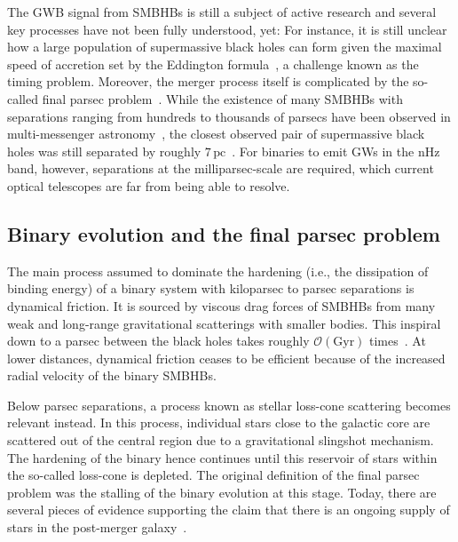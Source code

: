 The \ac{GWB} signal from \acp{SMBHB} is still a subject of active research and several key processes have not been fully understood, yet: For instance, it is still unclear how a large population of supermassive black holes can form given the maximal speed of accretion set by the Eddington formula~\cite{Volonteri:2021sfo}, a challenge known as the timing problem.  Moreover, the merger process itself is complicated by the so-called final parsec problem~\cite{Binney:1987, Milosavljevic:2002ht, Dosopoulou:2016hbg}. While the existence of many \acp{SMBHB} with separations ranging from hundreds to thousands of parsecs have been observed in multi-messenger astronomy~\cite{DeRosa:2019myq}, the closest observed pair of supermassive black holes was still separated by roughly $7 \, \text{pc}$~\cite{Rodriguez:2006th}. For binaries to emit \acp{GW} in the nHz band, however, separations at the milliparsec-scale are required, which current optical telescopes are far from being able to resolve.

\subsection{Binary evolution and the final parsec problem} \label{sec:finalpc}

The main process assumed to dominate the hardening (i.e., the dissipation of binding energy) of a binary system with kiloparsec to parsec separations is dynamical friction. It is sourced by viscous drag forces of \acp{SMBHB} from many weak and long-range gravitational scatterings with smaller bodies.  This inspiral down to a parsec between the black holes takes roughly $\mathcal{O}(\text{Gyr})$ times~\cite{Binney:1987, Dosopoulou:2016hbg}. At lower distances, dynamical friction ceases to be efficient because of the increased radial velocity of the binary \acp{SMBHB}.

Below parsec separations, a process known as stellar loss-cone scattering becomes relevant instead. In this process, individual stars close to the galactic core are scattered out of the central region due  to a gravitational slingshot mechanism. The hardening of the binary hence continues until this reservoir of stars within the so-called loss-cone is depleted. The original definition of the final parsec problem was the stalling of the binary evolution at this stage. Today, there are several pieces of evidence supporting the claim that there is an ongoing supply of stars in the post-merger galaxy~\cite{Vasiliev:2013az, Vasiliev:2013nha, Vasiliev:2015}.

